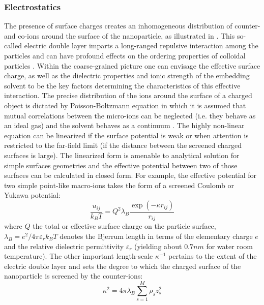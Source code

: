 \documentclass[amssymb]{revtex4}
\begin{document}
\subsubsection{{\bf Electrostatics}}
The presence of surface charges creates an inhomogeneous distribution of counter- and co-ions around the surface of the nanoparticle, as illustrated in . This so-called electric double layer imparts a long-ranged repulsive interaction among the particles and can have profound effects on the
ordering properties of colloidal particles \cite{hansenlowen2000}. 
Within the coarse-grained picture one can envisage the effective surface charge, as well as the dielectric properties and ionic strength of the embedding solvent to be the key factors determining the characteristics of this effective interaction.
The precise distribution of the ions around the surface of a charged object is dictated by Poisson-Boltzmann equation in which it is assumed that mutual correlations between the micro-ions can be neglected (i.e. they behave as an ideal gas) and the solvent behaves as a continuum \cite{verwey1955theory}. The highly non-linear equation can be linearized if the surface potential is weak or when attention is restricted to the far-field limit (if the distance between the screened charged surfaces is large). The linearized form is amenable to analytical solution for simple surfaces geometries and the effective potential between two of those surfaces can be calculated in closed form. For example, the effective potential for two simple point-like macro-ions takes the form of a screened Coulomb or Yukawa potential:
\begin{equation}
\frac{u_{ij}}{k_{B}T} = Q^{2} \lambda_{B} \frac{\exp (-\kappa r_{ij})}{r_{ij}}
\label{yukpot}
\end{equation}
 where $Q$ the total or effective surface charge on the particle surface, $\lambda _{B} = e^{2}/4 \pi \varepsilon_{r}k_{B}T$ denotes the Bjerrum length in terms of the elementary charge $e$ and the relative dielectric permittivity $\varepsilon_{r}$ (yielding about $0.7 nm$ for water room temperature). The other important length-scale $\kappa^{-1}$ pertains to the extent of the electric double layer and sets the degree to which the charged surface of the nanoparticle   is screened by the counter-ions:
 \begin{equation}
 \kappa^{2} = 4 \pi \lambda_{B}  \sum_{s=1}^{M} \rho_{s} z_{s}^{2} 
 \label{debye}
\end{equation}
\end{document}
